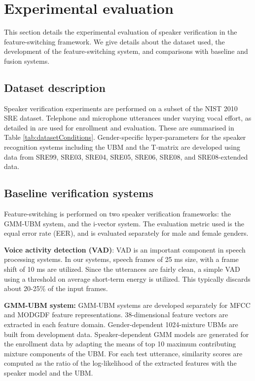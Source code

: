 \documentclass[preprint,12pt,5p]{elsarticle}
\begin{document}
\section{Experimental evaluation}
\label{sec:expts}
This section details the experimental evaluation of speaker verification in the
feature-switching framework. We give details about the dataset used, the
development of the feature-switching system, and comparisons with baseline and
fusion systems.

\subsection{Dataset description}
\label{sec:dB}
Speaker verification experiments are performed on a subset of
the NIST 2010 SRE dataset. Telephone and microphone utterances under varying 
vocal effort, as detailed in \cite{nist2010SRE} are used for enrollment and 
evaluation. These are summarised in Table \ref{tab:datasetConditions}. 
Gender-specific hyper-parameters for the speaker recognition systems including 
the UBM and the T-matrix are developed using data 
from SRE99, SRE03, SRE04, SRE05, SRE06, SRE08, and SRE08-extended data.

\subsection{Baseline verification systems}
\label{subsec:baseline}
Feature-switching is performed on two speaker verification frameworks: the GMM-UBM system, 
and the i-vector system. The evaluation
metric used is the equal error rate (EER), and is evaluated separately
for male and female genders.

\textbf{Voice activity detection (VAD)}: VAD is an important component in speech
processing systems. In our systems, speech frames of 25 ms size, with a frame
shift of 10 ms are utilized. Since the utterances are fairly clean, a simple VAD
using a threshold on average short-term energy is utilized. This typically
discards about 20-25\% of the input frames.

\textbf{GMM-UBM system:} GMM-UBM systems are developed separately for 
MFCC and MODGDF feature representations. 38-dimensional feature vectors are 
extracted in each feature domain. Gender-dependent 1024-mixture UBMs are built 
from development data.  Speaker-dependent GMM models are generated for the 
enrollment data by adapting the means of top 10 maximum contributing mixture 
components of the UBM. For each test utterance, similarity scores are computed 
as the ratio of the log-likelihood of the extracted features with the speaker
model and the UBM.
\end{document}
